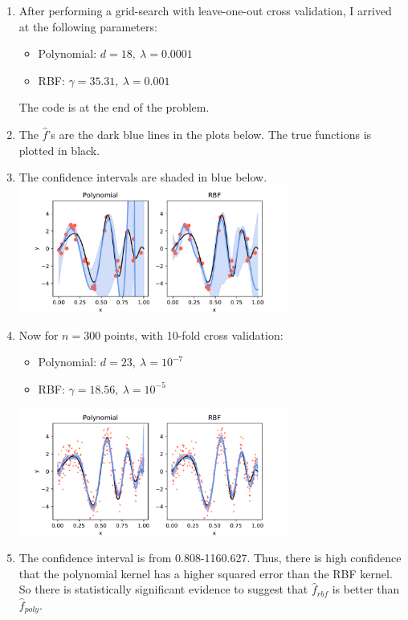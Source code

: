 \documentclass{article}
\begin{document}
\begin{enumerate}
        \item After performing a grid-search with leave-one-out cross validation, I arrived at the following parameters:
        \begin{itemize}
                \item Polynomial: $d = 18, ~ \lambda = 0.0001$ 
                \item RBF: $\gamma = 35.31, ~ \lambda = 0.001$
        \end{itemize}
        The code is at the end of the problem.

        \item The $\hat{f}$'s are the dark blue lines in the plots below.
        The true functions is plotted in black.
        \item The confidence intervals are shaded in blue below. \\
        \includegraphics[width=0.7\textwidth]{code/A4b.pdf}

        \item Now for $n=300$ points, with 10-fold cross validation:
        \begin{itemize}
                \item Polynomial: $d = 23, ~ \lambda = 10^{-7}$ 
                \item RBF: $\gamma = 18.56, ~ \lambda = 10^{-5}$
        \end{itemize}
        \includegraphics[width=0.7\textwidth]{code/A4d.pdf}

        \item The confidence interval is from 0.808-1160.627.
        Thus, there is high confidence that the polynomial kernel has a higher squared error than the RBF kernel.
        So there is statistically significant evidence to suggest that $\hat{f}_{rbf}$ is better than $\hat{f}_{poly}$.

\end{enumerate}
\end{document}
